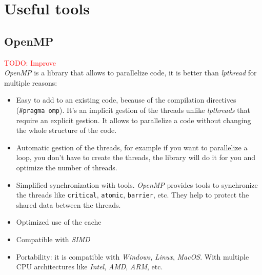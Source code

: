 \documentclass[12pt, openany]{report}
\theoremstyle{definition}
\begin{document}
\chapter{Useful tools}
\section{OpenMP}\label{OpenMP}
\textcolor{red}{TODO: Improve}\\
\textit{OpenMP} is a library that allows to parallelize code, it is better than \textit{lpthread} for multiple reasons:
\begin{itemize}
	\item Easy to add to an existing code, because of the compilation directives (\texttt{\#pragma omp}). It's an implicit gestion of the threads unlike \textit{lpthreads} that require an explicit gestion. It allows to parallelize a code without changing the whole structure of the code.
	\item Automatic gestion of the threads, for example if you want to parallelize a loop, you don't have to create the threads, the library will do it for you and optimize the number of threads.
	\item Simplified synchronization with tools. \textit{OpenMP} provides tools to synchronize the threads like \texttt{critical}, \texttt{atomic}, \texttt{barrier}, etc. They help to protect the shared data between the threads.
	\item Optimized use of the cache
	\item Compatible with \textit{SIMD}
	\item Portability: it is compatible with \textit{Windows}, \textit{Linux}, \textit{MacOS}. With multiple CPU architectures like \textit{Intel}, \textit{AMD}, \textit{ARM}, etc.
\end{itemize}
\end{document}
